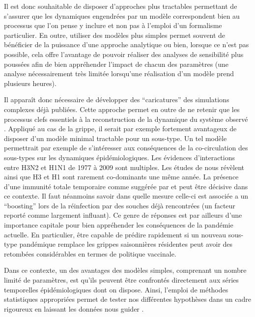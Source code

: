 Il est donc souhaitable de disposer d'approches plus tractables
permettant de s'assurer que les dynamiques engendrées par un modèle
correspondent bien au processus que l'on pense y inclure et non pas à
l'emploi d'un formalisme particulier.  En outre, utiliser des modèles
plus simples permet souvent de bénéficier de la puissance d'une
approche analytique ou bien, lorsque ce n'est pas possible, cela offre
l'avantage de pouvoir réaliser des analyses de sensibilité plus
poussées afin de bien appréhender l'impact de chacun des paramètres
(une analyse nécessairement très limitée lorsqu'une réalisation d'un
modèle prend plusieurs heures).

Il apparaît donc nécessaire de développer des ``caricatures'' des
simulations complexes déjà publiées. Cette approche permet en outre de
ne retenir que les processus clefs essentiels à la reconstruction de
la dynamique du système observé \citep{Ginzburg2004}. Appliqué au cas
de la grippe, il serait par exemple fortement avantageux de disposer
d'un modèle minimal tractable pour un sous-type. Un tel modèle
permettrait par exemple de s'intéresser aux conséquences de la
co-circulation des sous-types sur les dynamiques épidémiologiques. Les
évidences d'interactions entre H3N2 et H1N1 de 1977 à 2009 sont
multiples. Les études de \citep{Finkelman2007, Rambaut2008} nous
révèlent ainsi que H3 et H1 sont rarement co-dominants une même année.
La présence d'une immunité totale temporaire comme suggérée par
\citet{Webster1992} et \citet{Ferguson2003} peut être décisive dans ce
contexte. Il faut néanmoins savoir dans quelle mesure celle-ci est
associée a un ``boosting'' lors de la réinfection par des souches déjà
rencontrées (un facteur reporté comme largement influant). Ce genre de
réponses est par ailleurs d'une importance capitale pour bien
appréhender les conséquences de la pandémie actuelle. En particulier,
être capable de prédire rapidement si un nouveau sous-type pandémique
remplace les grippes saisonnières résidentes peut avoir des retombées
considérables en termes de politique vaccinale.

Dans ce contexte, un des avantages des modèles simples, comprenant un
nombre limité de paramètres, est qu'ils peuvent être confrontés
directement aux séries temporelles épidémiologiques dont on
dispose. Ainsi, l'emploi de méthodes statistiques appropriées permet
de tester nos différentes hypothèses dans un cadre rigoureux en
laissant les données nous guider \citep{King2008}.

